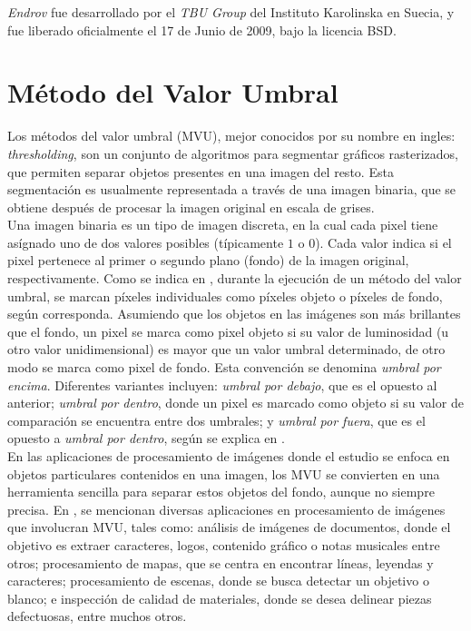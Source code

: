 \emph{Endrov} fue desarrollado por el \emph{TBU Group} del Instituto Karolinska en Suecia, y 
fue liberado oficialmente el 17 de Junio de 2009, bajo la licencia BSD.


\section{M\'etodo del Valor Umbral}
\label{sec:thresholding}

Los m\'etodos del valor umbral (MVU), mejor conocidos por su nombre en ingles: \emph{thresholding},
son un conjunto de algoritmos para segmentar gr\'aficos rasterizados, que permiten separar
objetos presentes en una imagen del resto. Esta segmentaci\'on es usualmente representada
a trav\'es de una imagen binaria, que se obtiene despu\'es de procesar la imagen original 
en escala de grises.\\

Una imagen binaria es un tipo de imagen discreta, en la cual cada pixel tiene as\'ignado uno de
dos valores posibles (t\'ipicamente $1$ o $0$). Cada valor indica si el pixel
pertenece al primer o segundo plano (fondo) de la imagen original, respectivamente.
Como se indica en \cite{web:thresholding}, durante la ejecuci\'on de un m\'etodo del valor
umbral, se marcan p\'ixeles individuales como p\'ixeles objeto o p\'ixeles de fondo, seg\'un
corresponda. Asumiendo que los objetos en las im\'agenes son m\'as brillantes que el fondo,
un pixel se marca como pixel objeto si su valor de luminosidad (u otro valor unidimensional) 
es mayor que un valor umbral determinado, de otro modo se marca como pixel de fondo.
Esta convenci\'on se denomina \emph{umbral por encima}. Diferentes variantes incluyen:
\emph{umbral por debajo}, que es el opuesto al anterior; \emph{umbral por dentro}, donde un
pixel es marcado como objeto si su valor de comparaci\'on se encuentra entre dos 
umbrales; y \emph{umbral por fuera}, que es el opuesto a \emph{umbral por dentro}, seg\'un
se explica en \cite{shapiro}.\\


En las aplicaciones de procesamiento de im\'agenes donde el estudio se enfoca en 
objetos particulares contenidos en una imagen, los MVU se convierten en una herramienta
sencilla para separar estos objetos del fondo, aunque no siempre precisa. En \cite[p.146]{thres},
se mencionan diversas aplicaciones en procesamiento de im\'agenes que involucran MVU, tales
como: an\'alisis de im\'agenes de documentos, donde el objetivo es extraer caracteres, logos,
contenido gr\'afico o notas musicales entre otros; procesamiento de mapas, que se centra en
encontrar l\'ineas, leyendas y caracteres; procesamiento de escenas, donde se busca detectar
un objetivo o blanco; e inspecci\'on de calidad de materiales, donde se desea delinear piezas
defectuosas, entre muchos otros.\\

